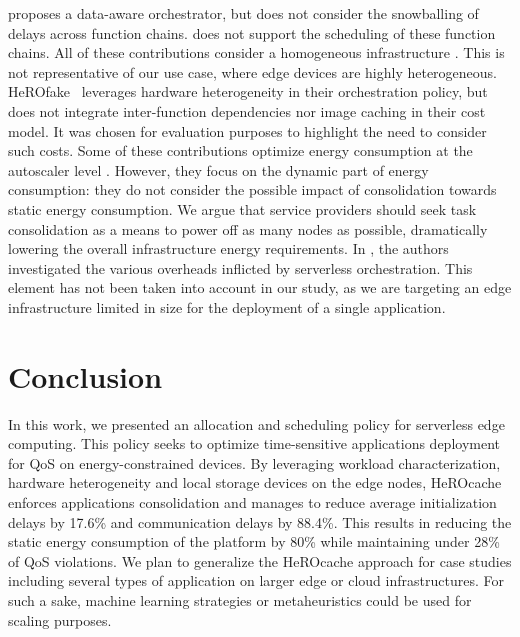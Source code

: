 \cite{smithFaDOFaaSFunctions2022} proposes a data-aware orchestrator, but does not consider the snowballing of delays across function chains. \cite{zhangFIRSTExploitingMultiDimensional2023} does not support the scheduling of these function chains.
All of these contributions consider a homogeneous infrastructure \cite{bhasiCypressInputSizesensitive2022, zijunFassflowEfficient2022, smithFaDOFaaSFunctions2022, zhangFIRSTExploitingMultiDimensional2023, abdiPaletteLoadBalancing2023}. This is not representative of our use case, where edge devices are highly heterogeneous. HeROfake~\cite{herofake} %
leverages hardware heterogeneity in their orchestration policy, but does not integrate inter-function dependencies nor image caching in their cost model. It was chosen for evaluation purposes to highlight the need to consider such costs. %
Some of these contributions optimize energy consumption at the autoscaler level \cite{bhasiCypressInputSizesensitive2022, zhangFIRSTExploitingMultiDimensional2023}. However, they focus on the dynamic part of energy consumption: they do not consider the possible impact of consolidation towards static energy consumption. We argue that service providers should seek task consolidation as a means to power off as many nodes as possible, dramatically lowering the overall infrastructure energy requirements.
In \cite{fuerstIluvatarFastControl2023}, the authors investigated the various overheads inflicted by serverless orchestration. This element has not been taken into account in our study, as we are targeting an edge infrastructure limited in size for the deployment of a single application.

\section{Conclusion}
\label{section:herocache-conclusion}

In this work, we presented an allocation and scheduling policy for serverless edge computing. This policy seeks to optimize time-sensitive applications deployment for QoS on energy-constrained devices. By leveraging workload characterization, hardware heterogeneity and local storage devices on the edge nodes, HeROcache enforces applications consolidation and manages to reduce average initialization delays by 17.6\% and communication delays by 88.4\%. This results in reducing the static energy consumption of the platform by 80\% while maintaining under 28\% of QoS violations. We plan to generalize the HeROcache approach for case studies including several types of application on larger edge or cloud infrastructures. For such a sake, machine learning strategies or metaheuristics could be used for scaling purposes.
